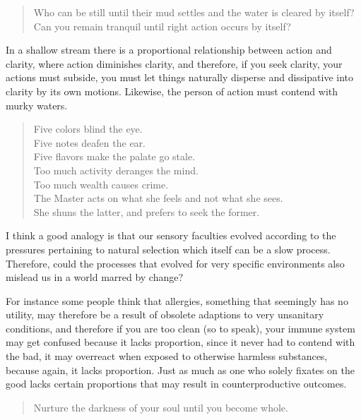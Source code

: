 \begin{verse}
Who can be still until their mud settles and the water is cleared by itself?\\
Can you remain tranquil until right action occurs by itself?\\
\end{verse}

In a shallow stream there is a proportional relationship between action and clarity, where action diminishes clarity, and therefore, if you seek clarity, your actions must subside, you must let things naturally disperse and dissipative into clarity by its own motions. Likewise, the person of action must contend with murky waters. 

\begin{verse}
Five colors blind the eye.\\
Five notes deafen the ear.\\
Five flavors make the palate go stale.\\
Too much activity deranges the mind.\\
Too much wealth causes crime.\\
The Master acts on what she feels and not what she sees.\\
She shuns the latter, and prefers to seek the former.\\
\end{verse}

I think a good analogy is that our sensory faculties evolved according to the pressures pertaining to natural selection which itself can be a slow process. Therefore, could the processes that evolved for very specific environments also mislead us in a world marred by change?

For instance some people think that allergies, something that seemingly has no utility, may therefore be a result of obsolete adaptions to very unsanitary conditions, and therefore if you are too clean (so to speak), your immune system may get confused because it lacks proportion, since it never had to contend with the bad, it may overreact when exposed to otherwise harmless substances, because again, it lacks proportion. Just as much as one who solely fixates on the good lacks certain proportions that may result in counterproductive outcomes. 

\begin{quotation}
Nurture the darkness of your soul until you become whole.
\end{quotation}


